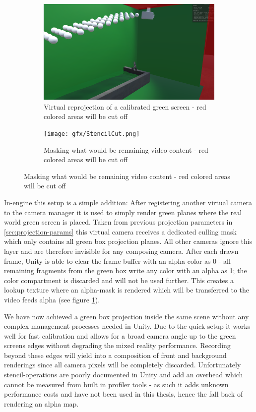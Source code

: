 \begin{figure}[htbp]
	\caption[Some Argument]{Virtual projection and photo of VR 
	actor\footnotemark}
	\label{fig:stencil:projection}
	\begin{subfigure}[t]{.45\textwidth}
		\centering
		\includegraphics[width=\textwidth]{gfx/StencilProjection.png}
		\caption{Virtual reprojection of a calibrated green screen - red 
		colored areas will be cut off}
	\end{subfigure}
	\begin{subfigure}[t]{.45\textwidth}
		\centering
		\texttt{[image: gfx/StencilCut.png]}
		\caption{Masking what would be remaining video content - red colored 
		areas will be cut off}
	\end{subfigure}
	\label{fig:virtual-proj-stencil}
\end{figure}

In-engine this setup is a simple addition: After registering another virtual 
camera to the camera manager it is used to simply render green planes where the 
real world green screen is placed. Taken from previous projection parameters in 
\ref{sec:projection-params} this virtual camera receives a dedicated culling 
mask which only contains all green box projection planes. All other cameras 
ignore this layer and are therefore invisible for any composing camera. After 
each drawn frame, Unity is able to clear the frame buffer with an alpha color 
as 0 - all remaining fragments from the green box write any color with an alpha 
as 1; the color compartment is discarded and will not be used further. This 
creates a lookup texture where an alpha-mask is rendered which will be 
transferred to the video feeds alpha (see figure 
\ref{fig:virtual-proj-stencil}).

We have now achieved a green box projection inside the same scene without any 
complex management processes needed in Unity. Due to the quick setup it works 
well for fast calibration and allows for a broad camera angle up to the green 
screens edges without degrading the mixed reality performance. Recording beyond 
these edges will yield into a composition of front and background renderings 
since all camera pixels will be completely discarded.
\newline
Unfortunately stencil-operations are poorly documented in Unity and add an 
overhead which cannot be measured from built in profiler tools - as such it 
adds unknown performance costs and have not been used in this thesis, hence the 
fall back of rendering an alpha map.